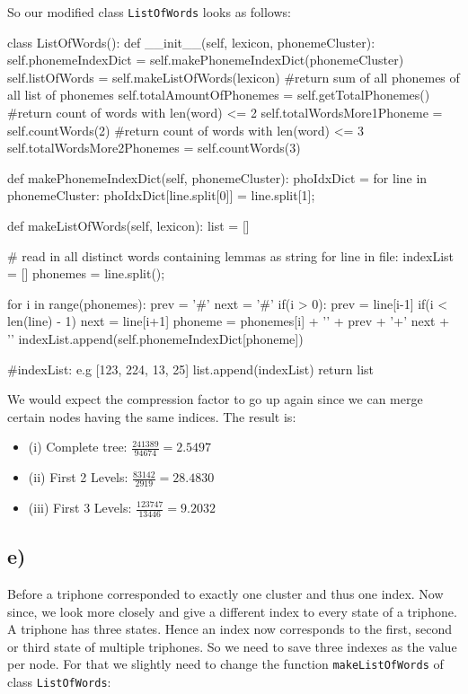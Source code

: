 So our modified class \lstinline|ListOfWords| looks as follows:

\begin{python}
class ListOfWords():
	def __init__(self, lexicon, phonemeCluster):
		self.phonemeIndexDict = self.makePhonemeIndexDict(phonemeCluster)
		self.listOfWords = self.makeListOfWords(lexicon)
		#return sum of all phonemes of all list of phonemes
		self.totalAmountOfPhonemes = self.getTotalPhonemes() 
		#return count of words with len(word) <= 2
		self.totalWordsMore1Phoneme = self.countWords(2)
		#return count of words with len(word) <= 3 
		self.totalWordsMore2Phonemes = self.countWords(3) 

	def makePhonemeIndexDict(self, phonemeCluster):
		phoIdxDict = {}
		for line in phonemeCluster: 
			phoIdxDict[line.split[0]] = line.split[1];

	def makeListOfWords(self, lexicon):
		list = []

		# read in all distinct words containing lemmas as string
		for line in file:
			indexList = []
			phonemes = line.split();

			for i in range(phonemes):
				prev = '#'
				next = '#'
				if(i > 0):
					prev = line[i-1]
				if(i < len(line) - 1)
					next = line[i+1]
				phoneme = phonemes[i] + '{' + prev + '+' next + '}'
				indexList.append(self.phonemeIndexDict[phoneme])

			#indexList: e.g [123, 224, 13, 25]
			list.append(indexList)
		return list
\end{python}

We would expect the compression factor to go up again since we can merge certain nodes having the same 
indices. The result is: 

\begin{itemize}
	\item (i) Complete tree: $\frac{241389}{94674} = 2.5497$
	\item (ii) First 2 Levels: $\frac{83142}{2919} = 28.4830$
	\item (iii) First 3 Levels: $\frac{123747}{13446} = 9.2032$
\end{itemize}

\subsection*{e)} %
\label{sub:e_}

Before a triphone corresponded to exactly one cluster and thus one index. Now since, we look more closely and give a different index to 
every state of a triphone. A triphone has three states. Hence an index now corresponds to the first, second or third state of multiple 
triphones. So we need to save three indexes as the value per node. For that we slightly need to change the function 
\lstinline|makeListOfWords| of class \lstinline|ListOfWords|:

